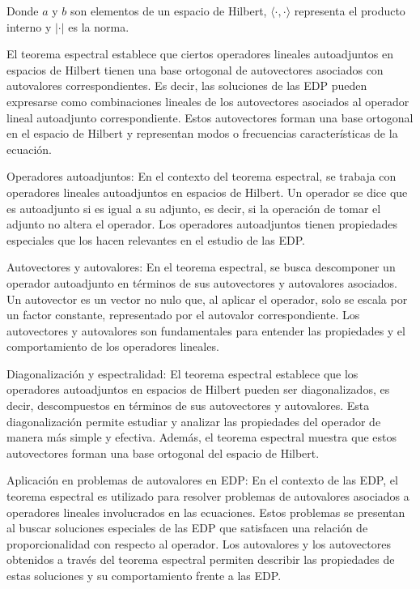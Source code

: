 \documentclass{article}
\begin{document}
        Donde $a$ y $b$ son elementos de un espacio de Hilbert, $\langle \cdot, \cdot \rangle$ representa el producto interno y $| \cdot |$ es la norma.
    

    El teorema espectral establece que ciertos operadores lineales autoadjuntos en espacios de Hilbert tienen una base ortogonal de autovectores asociados con autovalores correspondientes.
    Es decir, las soluciones de las EDP pueden expresarse como combinaciones lineales de los autovectores asociados al operador lineal autoadjunto correspondiente. Estos autovectores forman una base ortogonal en el espacio de Hilbert y representan modos o frecuencias características de la ecuación.
        
    Operadores autoadjuntos: En el contexto del teorema espectral, se trabaja con operadores lineales autoadjuntos en espacios de Hilbert. Un operador se dice que es autoadjunto si es igual a su adjunto, es decir, si la operación de tomar el adjunto no altera el operador. Los operadores autoadjuntos tienen propiedades especiales que los hacen relevantes en el estudio de las EDP.

    Autovectores y autovalores: En el teorema espectral, se busca descomponer un operador autoadjunto en términos de sus autovectores y autovalores asociados. Un autovector es un vector no nulo que, al aplicar el operador, solo se escala por un factor constante, representado por el autovalor correspondiente. Los autovectores y autovalores son fundamentales para entender las propiedades y el comportamiento de los operadores lineales.

    Diagonalización y espectralidad: El teorema espectral establece que los operadores autoadjuntos en espacios de Hilbert pueden ser diagonalizados, es decir, descompuestos en términos de sus autovectores y autovalores. Esta diagonalización permite estudiar y analizar las propiedades del operador de manera más simple y efectiva. Además, el teorema espectral muestra que estos autovectores forman una base ortogonal del espacio de Hilbert.

    Aplicación en problemas de autovalores en EDP: En el contexto de las EDP, el teorema espectral es utilizado para resolver problemas de autovalores asociados a operadores lineales involucrados en las ecuaciones. Estos problemas se presentan al buscar soluciones especiales de las EDP que satisfacen una relación de proporcionalidad con respecto al operador. Los autovalores y los autovectores obtenidos a través del teorema espectral permiten describir las propiedades de estas soluciones y su comportamiento frente a las EDP.
\end{document}
